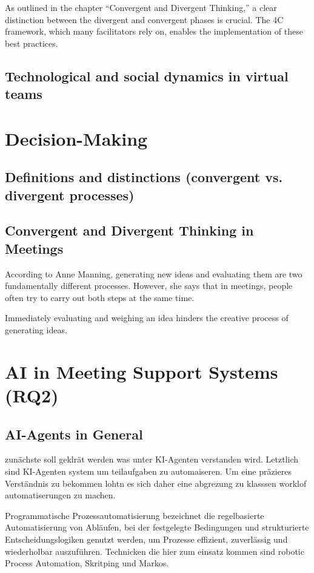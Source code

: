 As outlined in the chapter “Convergent and Divergent Thinking,” a clear distinction between the divergent and
convergent phases is crucial. The 4C framework, which many facilitators rely on, enables
the implementation of these best practices.

\subsection{Technological and social dynamics in virtual teams}

\section{Decision-Making}
\subsection{Definitions and distinctions (convergent vs. divergent processes)}

\subsection{Convergent and Divergent Thinking in Meetings}

According to Anne Manning, generating new ideas and evaluating them are two fundamentally different
processes. However, she says that in meetings, people often try to carry out both steps at the same time.
\cite[min 02:30]{professional&executivedevelopment-harvarddceConvergentVsDivergent2024}

Immediately evaluating and weighing an idea hinders the creative process of generating ideas.

\section{AI in Meeting Support Systems (RQ2)}

\subsection{AI-Agents in General}

zunächste soll geklrät werden was unter KI-Agenten verstanden wird.
Letztlich sind KI-Agenten system um teilaufgaben zu automaiseren.
Um eine präzieres Verständnis zu bekommen lohtn es sich daher eine abgrezung zu klasssen worklof
automatiserungen zu machen.

Programmatische Prozessautomatisierung bezeichnet die regelbasierte Automatisierung von Abläufen, bei der
festgelegte Bedingungen und strukturierte Entscheidungslogiken genutzt werden, um Prozesse effizient,
zuverlässig und wiederholbar auszuführen. Technicken die hier zum einsatz kommen sind robotic Process
Automation, Skritping und Markos.

